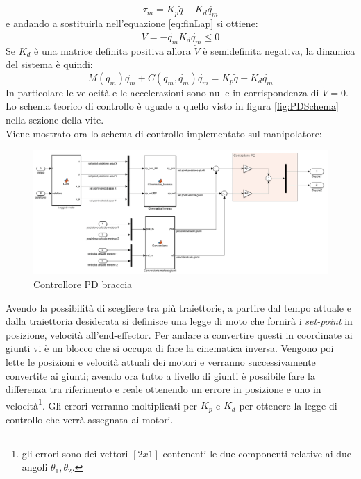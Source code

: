 \begin{equation}
\tau_m = K_p\tilde{q} - K_d\dot{q_m}
\end{equation}
e andando a sostituirla nell'equazione \ref{eq:finLap} si ottiene:
\begin{equation*}
\dot{V} = -\dot{q_m}K_d \dot{q_m} \le 0
\end{equation*}
Se $K_d$ è una matrice definita positiva allora $\dot{V}$ è semidefinita negativa, la dinamica del sistema è quindi:
\begin{equation}
M(q_m)\ddot{q_m} + C(q_m,\dot{q_m})\dot{q_m} = K_p\tilde{q}-K_d\dot{q_m}
\end{equation}
In particolare le velocità e le accelerazioni sono nulle in corrispondenza di $\dot{V} = 0$. Lo schema teorico di controllo è uguale a quello visto in figura \ref{fig:PDSchema} nella sezione della vite.
\\ Viene mostrato ora lo schema di controllo implementato sul manipolatore:
\begin{figure}[ht]
	\begin{center}
		\includegraphics[scale=0.37]{Immagini/Controllori/PDBraccia}
		\caption{Controllore PD braccia}
		\label{fig:PDBraccia}
	\end{center}
\end{figure}
Avendo la possibilità di scegliere tra più traiettorie, a partire dal tempo attuale e dalla traiettoria desiderata si definisce una legge di moto che fornirà i \textit{set-point} in posizione, velocità all'end-effector. Per andare a convertire questi in coordinate ai giunti vi è un blocco che si occupa di fare la cinematica inversa. Vengono poi lette le posizioni e velocità attuali dei motori e verranno successivamente convertite ai giunti; avendo ora tutto a livello di giunti è possibile fare la differenza tra riferimento e reale ottenendo un errore in posizione e uno in velocità\footnote{gli errori sono dei vettori $[2x1]$ contenenti le due componenti relative ai due angoli $\theta_1, \theta_2$.}. Gli errori verranno moltiplicati per $K_p$ e $K_d$ per ottenere la legge di controllo che verrà assegnata ai motori.
